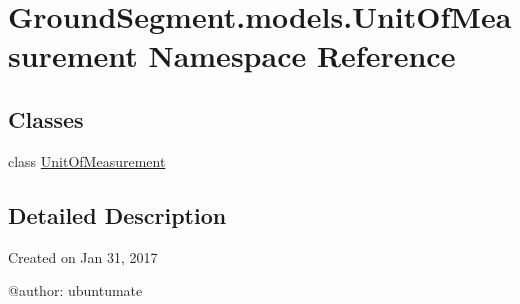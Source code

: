 \hypertarget{namespace_ground_segment_1_1models_1_1_unit_of_measurement}{}\section{Ground\+Segment.\+models.\+Unit\+Of\+Measurement Namespace Reference}
\label{namespace_ground_segment_1_1models_1_1_unit_of_measurement}
\subsection*{Classes}
\begin{DoxyCompactItemize}
\item 
class \hyperlink{class_ground_segment_1_1models_1_1_unit_of_measurement_1_1_unit_of_measurement}{Unit\+Of\+Measurement}
\end{DoxyCompactItemize}


\subsection{Detailed Description}
\begin{DoxyVerb}Created on Jan 31, 2017

@author: ubuntumate
\end{DoxyVerb}
 